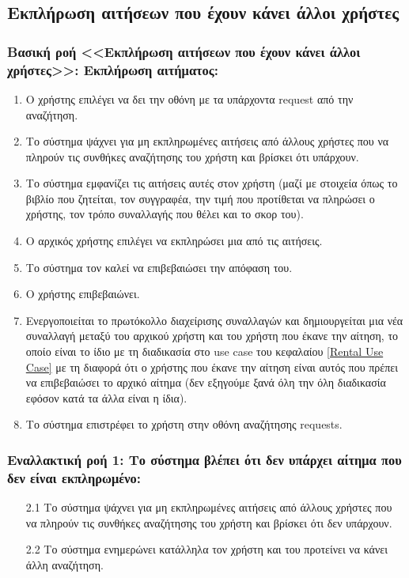\documentclass[12pt,a4paper]{article}
\begin{document}
\subsection{Εκπλήρωση αιτήσεων που έχουν κάνει άλλοι χρήστες}

\subsubsection*{Βασική ροή <<Εκπλήρωση αιτήσεων που έχουν κάνει άλλοι χρήστες>>: Εκπλήρωση αιτήματος:}
\begin{enumerate}
    \item Ο χρήστης επιλέγει να δει την οθόνη με τα υπάρχοντα request από την αναζήτηση.
    \item Το σύστημα ψάχνει για μη εκπληρωμένες αιτήσεις από άλλους χρήστες που να πληρούν τις συνθήκες αναζήτησης του χρήστη και βρίσκει ότι υπάρχουν.
    \item Το σύστημα εμφανίζει τις αιτήσεις αυτές στον χρήστη (μαζί με στοιχεία όπως το βιβλίο που ζητείται, τον συγγραφέα, την τιμή που προτίθεται να πληρώσει ο χρήστης, τον τρόπο συναλλαγής που θέλει και το σκορ του). 
    \item Ο αρχικός χρήστης επιλέγει να εκπληρώσει μια από τις αιτήσεις.
    \item Το σύστημα τον καλεί να επιβεβαιώσει την απόφαση του.
    \item Ο χρήστης επιβεβαιώνει.
    \item Ενεργοποιείται το πρωτόκολλο διαχείρισης συναλλαγών και δημιουργείται μια νέα συναλλαγή μεταξύ του αρχικού χρήστη και του χρήστη που έκανε την αίτηση, το οποίο είναι το ίδιο με τη διαδικασία στο use case του κεφαλαίου \ref{Rental Use Case} με τη διαφορά ότι ο χρήστης που έκανε την αίτηση είναι αυτός που πρέπει να επιβεβαιώσει το αρχικό αίτημα (δεν εξηγούμε ξανά όλη την όλη διαδικασία εφόσον κατά τα άλλα είναι η ίδια).
    \item Το σύστημα επιστρέφει το χρήστη στην οθόνη αναζήτησης requests.
\end{enumerate}

\subsubsection*{Εναλλακτική ροή 1: Το σύστημα βλέπει ότι δεν υπάρχει αίτημα που δεν είναι εκπληρωμένο:}
\begin{enumerate}
    \item [2.1] Το σύστημα ψάχνει για μη εκπληρωμένες αιτήσεις από άλλους χρήστες που να πληρούν τις συνθήκες αναζήτησης του χρήστη και βρίσκει ότι δεν υπάρχουν.
    \item [2.2] Το σύστημα ενημερώνει κατάλληλα τον χρήστη και του προτείνει να κάνει άλλη αναζήτηση.
\end{enumerate}
\end{document}
